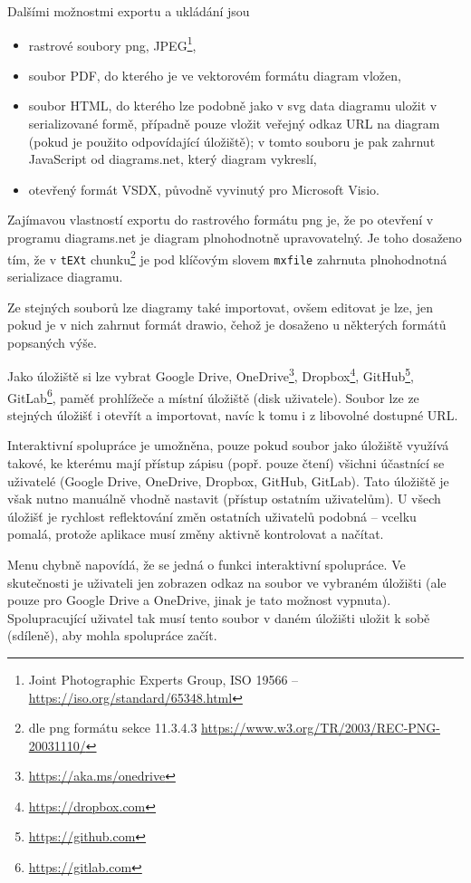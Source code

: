 Dalšími možnostmi exportu a ukládání jsou
\begin{itemize}
  \item rastrové soubory \acrshort{png}, JPEG\footnote{Joint Photographic Experts Group, ISO 19566 -- \url{https://iso.org/standard/65348.html}},
  \item soubor PDF, do kterého je ve vektorovém formátu diagram vložen,
  \item soubor HTML, do kterého lze podobně jako v \acrshort{svg} data diagramu uložit v serializované formě, případně pouze vložit veřejný odkaz URL na diagram (pokud je použito odpovídající úložiště);
        v tomto souboru je pak zahrnut JavaScript od diagrams.net, který diagram vykreslí,
  \item otevřený formát VSDX, původně vyvinutý pro Microsoft Visio.
\end{itemize}

Zajímavou vlastností exportu do rastrového formátu \acrshort{png} je, že po otevření v programu diagrams.net je diagram plnohodnotně upravovatelný.
Je toho dosaženo tím, že v \texttt{tEXt} chunku\footnote{dle \acrshort{png} formátu sekce 11.3.4.3 \url{https://www.w3.org/TR/2003/REC-PNG-20031110/}}
je pod klíčovým slovem \texttt{mxfile} zahrnuta plnohodnotná serializace diagramu.

Ze stejných souborů lze diagramy také importovat, ovšem editovat je lze, jen pokud je v nich zahrnut formát drawio, čehož je dosaženo u některých formátů popsaných výše.

Jako úložiště si lze vybrat Google Drive,
OneDrive\footnote{\url{https://aka.ms/onedrive}},
Dropbox\footnote{\url{https://dropbox.com}},
GitHub\footnote{\url{https://github.com}},
Git\-Lab\footnote{\url{https://gitlab.com}},
paměť prohlížeče a místní úložiště (disk uživatele).
Soubor lze ze stejných úložišť i otevřít a importovat, navíc k tomu i z libovolné dostupné URL.

Interaktivní spolupráce je umožněna, pouze pokud soubor jako úložiště využívá takové, ke kterému mají přístup zápisu (popř. pouze čtení) všichni účastnící se uživatelé (Google Drive, OneDrive, Dropbox, GitHub, GitLab).
Tato úložiště je však nutno manuálně vhodně nastavit (přístup ostatním uživatelům).
U všech úložišť je rychlost reflektování změn ostatních uživatelů podobná -- vcelku pomalá, protože aplikace musí změny aktivně kontrolovat a načítat.

Menu  chybně napovídá, že se jedná o funkci interaktivní spolupráce.
Ve skutečnosti je uživateli jen zobrazen odkaz na soubor ve vybraném úložišti (ale pouze pro Google Drive a OneDrive, jinak je tato možnost vypnuta).
Spolupracující uživatel tak musí tento soubor v daném úložišti uložit k sobě (sdíleně), aby mohla spolupráce začít.

